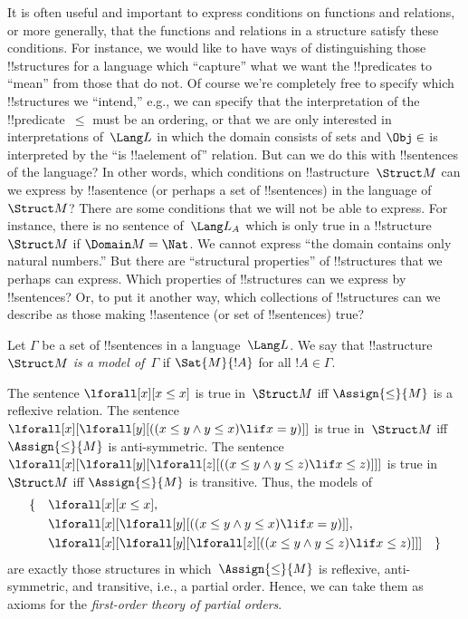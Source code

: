 \documentclass[../../../include/open-logic-section]{subfiles}
\begin{document}

\begin{explain}
It is often useful and important to express conditions on
functions and relations, or more generally, that the functions and
relations in a structure satisfy these conditions.  For instance, we
would like to have ways of distinguishing those !!{structure}s for a
language which ``capture'' what we want the !!{predicate}s to ``mean''
from those that do not.  Of course we're completely free to specify
which !!{structure}s we ``intend,'' e.g., we can specify that the
interpretation of the !!{predicate}~$\le$ must be an ordering, or that
we are only interested in interpretations of~$\Lang L$ in which the
domain consists of sets and $\Obj \in$ is interpreted by the ``is
!!a{element} of'' relation.  But can we do this with !!{sentence}s of
the language?  In other words, which conditions on
!!a{structure}~$\Struct M$ can we express by !!a{sentence} (or perhaps
a set of !!{sentence}s) in the language of~$\Struct M$?  There are
some conditions that we will not be able to express.  For instance,
there is no sentence of~$\Lang L_A$ which is only true in a
!!{structure}~$\Struct M$ if $\Domain M = \Nat$.  We cannot express
``the domain contains only natural numbers.''  But there are
``structural properties'' of !!{structure}s that we perhaps can
express.  Which properties of !!{structure}s can we express by
!!{sentence}s?  Or, to put it another way, which collections of
!!{structure}s can we describe as those making !!a{sentence} (or set
of !!{sentence}s) true?
\end{explain}

\begin{defn}
Let $\Gamma$ be a set of !!{sentence}s in a language~$\Lang L$.  We
say that !!a{structure}~$\Struct M$ \emph{is a model of}~$\Gamma$ if
$\Sat{M}{!A}$ for all $!A \in \Gamma$.
\end{defn}

\begin{ex}
The sentence $\lforall[x][x \le x]$ is true in~$\Struct M$ iff
$\Assign{\le}{M}$ is a reflexive relation.  The sentence
$\lforall[x][\lforall[y][((x \le y \land y \le x) \lif x = y)]]$ is
true in~$\Struct M$ iff $\Assign{\le}{M}$ is anti-symmetric.  The
sentence $\lforall[x][\lforall[y][\lforall[z][((x \le y \land y \le z)
      \lif x \le z)]]]$ is true in~$\Struct M$ iff $\Assign{\le}{M}$
is transitive.  Thus, the models of
\begin{align*}
\{\quad &\lforall[x][x \le x], \\
   & \lforall[x][\lforall[y][((x \le y \land y \le
    x) \lif x = y)]], \\
   &\lforall[x][\lforall[y][\lforall[z][((x \le y
      \land y \le z) \lif x \le z)]]] \quad \}
\end{align*}
are exactly those structures in which~$\Assign{\le}{M}$ is reflexive,
anti-symmetric, and transitive, i.e., a partial order.  Hence, we can take
them as axioms for the \emph{first-order theory of partial orders}.
\end{ex}
\end{document}
